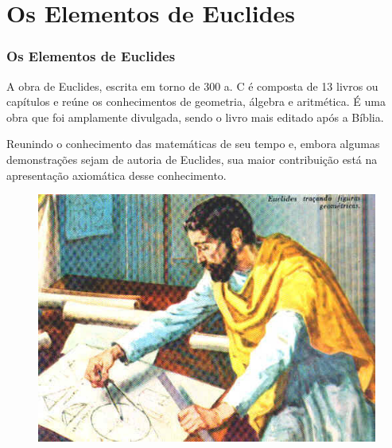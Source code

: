 \section{Os Elementos de Euclides}
\begin{frame}
    \frametitle{Os Elementos de Euclides}
    \justifying
    A obra de Euclides, escrita em torno de 300 a. C é composta de 13 livros ou capítulos e reúne os conhecimentos de geometria, álgebra e aritmética. É uma obra que foi amplamente divulgada, sendo o livro mais editado após a Bíblia. 
    \vspace{3mm}

    Reunindo o conhecimento das matemáticas de seu tempo e, embora algumas demonstrações sejam de autoria de Euclides, sua maior contribuição está na apresentação axiomática desse conhecimento.

    \begin{figure}[H]
        \centering
        \includegraphics[scale=0.30]{img/elements.jpg}
    \end{figure}
\end{frame}

